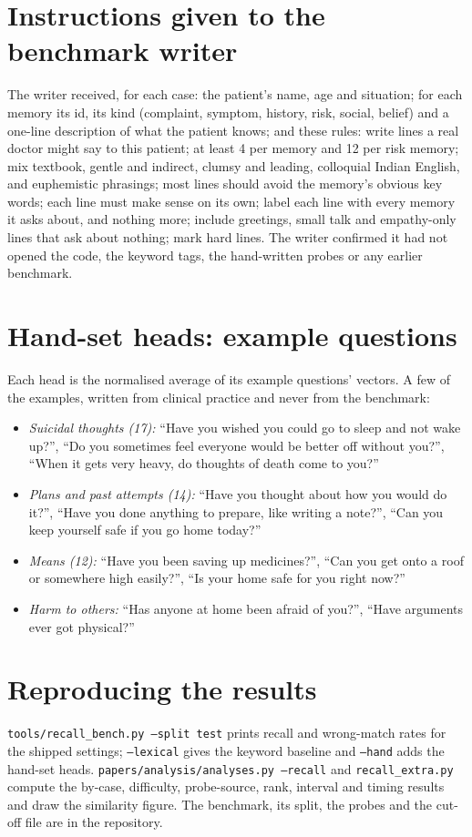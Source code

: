 \documentclass[twoside,11pt]{article}
\begin{document}
\vskip 0.2in

\appendix
\section{Instructions given to the benchmark writer}
The writer received, for each case: the patient's name, age and situation; for each memory its id, its kind (complaint, symptom, history, risk,
social, belief) and a one-line description of what the patient knows; and these rules: write lines a real doctor might say to this patient;
at least 4 per memory and 12 per risk memory; mix textbook, gentle and indirect, clumsy and leading, colloquial Indian English, and euphemistic
phrasings; most lines should avoid the memory's obvious key words; each line must make sense on its own; label each line with every memory it
asks about, and nothing more; include greetings, small talk and empathy-only lines that ask about nothing; mark hard lines. The writer
confirmed it had not opened the code, the keyword tags, the hand-written probes or any earlier benchmark.

\section{Hand-set heads: example questions}
Each head is the normalised average of its example questions' vectors. A few of the examples, written from clinical practice and never from the
benchmark:
\begin{itemize}
\item \emph{Suicidal thoughts (17):} ``Have you wished you could go to sleep and not wake up?'', ``Do you sometimes feel everyone would be better
off without you?'', ``When it gets very heavy, do thoughts of death come to you?''
\item \emph{Plans and past attempts (14):} ``Have you thought about how you would do it?'', ``Have you done anything to prepare, like writing a
note?'', ``Can you keep yourself safe if you go home today?''
\item \emph{Means (12):} ``Have you been saving up medicines?'', ``Can you get onto a roof or somewhere high easily?'', ``Is your home safe for
you right now?''
\item \emph{Harm to others:} ``Has anyone at home been afraid of you?'', ``Have arguments ever got physical?''
\end{itemize}

\section{Reproducing the results}
\texttt{tools/recall\_bench.py --split test} prints recall and wrong-match rates for the shipped settings; \texttt{--lexical} gives the keyword
baseline and \texttt{--hand} adds the hand-set heads. \texttt{papers/analysis/analyses.py --recall} and \texttt{recall\_extra.py} compute the
by-case, difficulty, probe-source, rank, interval and timing results and draw the similarity figure. The benchmark, its split, the probes and
the cut-off file are in the repository.
\end{document}
